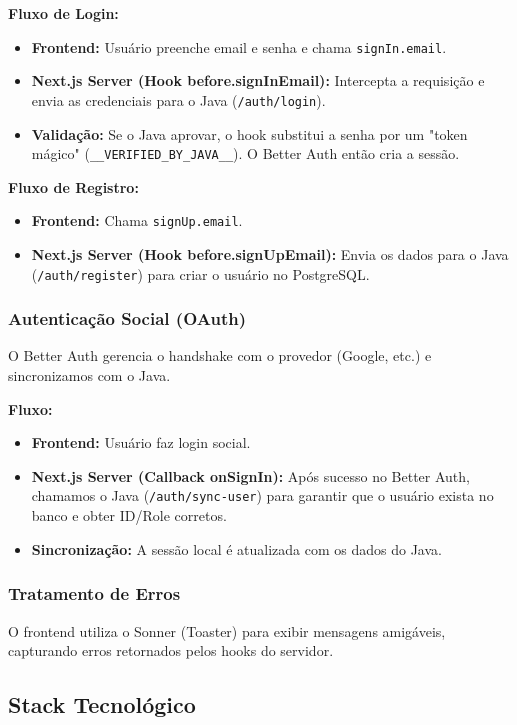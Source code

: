 \documentclass[12pt,a4paper]{article}
\begin{document}
\textbf{Fluxo de Login:}
\begin{itemize}
    \item \textbf{Frontend:} Usuário preenche email e senha e chama \texttt{signIn.email}.
    \item \textbf{Next.js Server (Hook before.signInEmail):} Intercepta a requisição e envia as credenciais para o Java (\texttt{/auth/login}).
    \item \textbf{Validação:} Se o Java aprovar, o hook substitui a senha por um "token mágico" (\texttt{\_\_VERIFIED\_BY\_JAVA\_\_}). O Better Auth então cria a sessão.
\end{itemize}

\textbf{Fluxo de Registro:}
\begin{itemize}
    \item \textbf{Frontend:} Chama \texttt{signUp.email}.
    \item \textbf{Next.js Server (Hook before.signUpEmail):} Envia os dados para o Java (\texttt{/auth/register}) para criar o usuário no PostgreSQL.
\end{itemize}

\subsubsection{Autenticação Social (OAuth)}
O Better Auth gerencia o handshake com o provedor (Google, etc.) e sincronizamos com o Java.

\textbf{Fluxo:}
\begin{itemize}
    \item \textbf{Frontend:} Usuário faz login social.
    \item \textbf{Next.js Server (Callback onSignIn):} Após sucesso no Better Auth, chamamos o Java (\texttt{/auth/sync-user}) para garantir que o usuário exista no banco e obter ID/Role corretos.
    \item \textbf{Sincronização:} A sessão local é atualizada com os dados do Java.
\end{itemize}

\subsubsection{Tratamento de Erros}
O frontend utiliza o Sonner (Toaster) para exibir mensagens amigáveis, capturando erros retornados pelos hooks do servidor.

\subsection{Stack Tecnológico}
\end{document}
